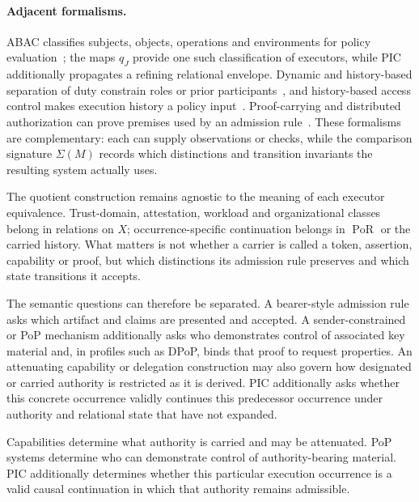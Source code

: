 \documentclass[10pt,twocolumn]{article}
\newcommand{\PoR}{\operatorname{PoR}}
\begin{document}
\paragraph{Adjacent formalisms.}
ABAC classifies subjects, objects, operations and environments for policy
evaluation~\cite{hu2014abac}; the maps \(q_J\) provide one such classification
of executors, while PIC additionally propagates a refining relational envelope.
Dynamic and history-based separation of duty constrain roles or prior
participants~\cite{ferraiolo2001rbac,simon1997sod}, and history-based access
control makes execution history a policy input~\cite{abadi2003history}.
Proof-carrying and distributed authorization can prove premises used by an
admission rule~\cite{appel1999pca,bauer2005distributed}. These formalisms are
complementary: each can supply observations or checks, while the comparison
signature \(\Sigma(M)\) records which distinctions and transition invariants
the resulting system actually uses.

The quotient construction remains agnostic to the meaning of each executor
equivalence. Trust-domain, attestation, workload and organizational classes
belong in relations on \(X\); occurrence-specific continuation belongs in
\(\PoR\) or the carried history. What matters is not whether a carrier is
called a token, assertion, capability or proof, but which distinctions its
admission rule preserves and which state transitions it accepts.

The semantic questions can therefore be separated. A bearer-style admission
rule asks which artifact and claims are presented and accepted. A
sender-constrained or PoP mechanism additionally asks who demonstrates control
of associated key material and, in profiles such as DPoP, binds that proof to
request properties. An attenuating capability or delegation construction may
also govern how designated or carried authority is restricted as it is derived.
PIC additionally asks whether this concrete occurrence validly continues this
predecessor occurrence under authority and relational state that have not
expanded.

Capabilities determine what authority is carried and may be attenuated.
PoP systems determine who can demonstrate control of authority-bearing material.
PIC additionally determines whether this particular execution occurrence is a valid causal continuation in which that authority remains admissible.
\end{document}
